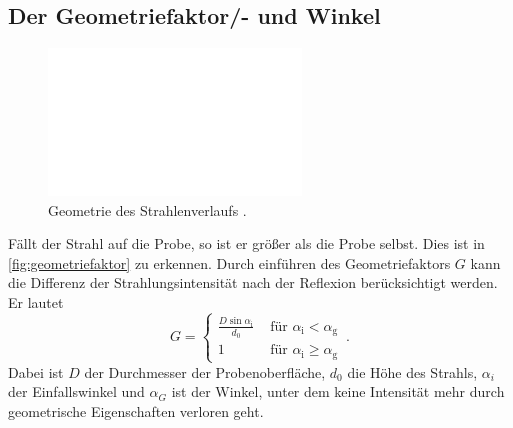 \subsection{Der Geometriefaktor/- und Winkel}
\begin{figure}
    \centering
    \includegraphics[width=0.6\textwidth]{pictures/geometriefaktor.pdf}
    \caption{Geometrie des Strahlenverlaufs \cite{v44}.}
    \label{fig:geometriefaktor}
\end{figure}
Fällt der Strahl auf die Probe, so ist er größer als die Probe selbst.
Dies ist in \autoref{fig:geometriefaktor} zu erkennen.
Durch einführen des Geometriefaktors $G$ kann die Differenz der Strahlungsintensität nach der Reflexion berücksichtigt werden. 
Er lautet
\begin{equation} \label{eq:geometriefaktor}
    G= \begin{cases}\frac{D \sin \alpha_{\mathrm{i}}}{d_0} & \text { für } \alpha_{\mathrm{i}}<\alpha_{\mathrm{g}} \\ 1 & \text { für } \alpha_{\mathrm{i}} \geq \alpha_{\mathrm{g}}\end{cases} \, .
\end{equation}
Dabei ist $D$ der Durchmesser der Probenoberfläche, $d_0$ die Höhe des Strahls, $\alpha_i$ der Einfallswinkel und $\alpha_G$ ist der Winkel, unter dem keine Intensität mehr
durch geometrische Eigenschaften verloren geht.
